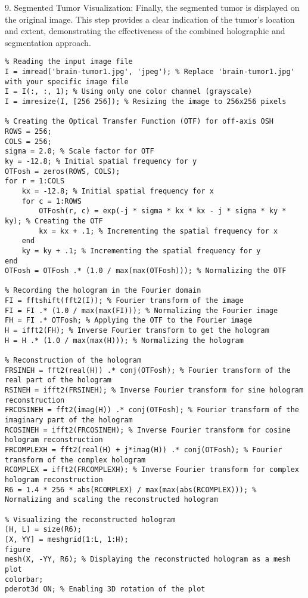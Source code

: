 \begin{appendices}
9. Segmented Tumor Visualization: Finally, the segmented tumor is displayed on the original image. This step provides a clear indication of the tumor's location and extent, demonstrating the effectiveness of the combined holographic and segmentation approach.
\\
\begin{lstlisting}
% Reading the input image file
I = imread('brain-tumor1.jpg', 'jpeg'); % Replace 'brain-tumor1.jpg' with your specific image file
I = I(:, :, 1); % Using only one color channel (grayscale)
I = imresize(I, [256 256]); % Resizing the image to 256x256 pixels

% Creating the Optical Transfer Function (OTF) for off-axis OSH
ROWS = 256;
COLS = 256;
sigma = 2.0; % Scale factor for OTF
ky = -12.8; % Initial spatial frequency for y
OTFosh = zeros(ROWS, COLS);
for r = 1:COLS
    kx = -12.8; % Initial spatial frequency for x
    for c = 1:ROWS
        OTFosh(r, c) = exp(-j * sigma * kx * kx - j * sigma * ky * ky); % Creating the OTF
        kx = kx + .1; % Incrementing the spatial frequency for x
    end
    ky = ky + .1; % Incrementing the spatial frequency for y
end
OTFosh = OTFosh .* (1.0 / max(max(OTFosh))); % Normalizing the OTF

% Recording the hologram in the Fourier domain
FI = fftshift(fft2(I)); % Fourier transform of the image
FI = FI .* (1.0 / max(max(FI))); % Normalizing the Fourier image
FH = FI .* OTFosh; % Applying the OTF to the Fourier image
H = ifft2(FH); % Inverse Fourier transform to get the hologram
H = H .* (1.0 / max(max(H))); % Normalizing the hologram

% Reconstruction of the hologram
FRSINEH = fft2(real(H)) .* conj(OTFosh); % Fourier transform of the real part of the hologram
RSINEH = ifft2(FRSINEH); % Inverse Fourier transform for sine hologram reconstruction
FRCOSINEH = fft2(imag(H)) .* conj(OTFosh); % Fourier transform of the imaginary part of the hologram
RCOSINEH = ifft2(FRCOSINEH); % Inverse Fourier transform for cosine hologram reconstruction
FRCOMPLEXH = fft2(real(H) + j*imag(H)) .* conj(OTFosh); % Fourier transform of the complex hologram
RCOMPLEX = ifft2(FRCOMPLEXH); % Inverse Fourier transform for complex hologram reconstruction
R6 = 1.4 * 256 * abs(RCOMPLEX) / max(max(abs(RCOMPLEX))); % Normalizing and scaling the reconstructed hologram

% Visualizing the reconstructed hologram
[H, L] = size(R6);
[X, YY] = meshgrid(1:L, 1:H);
figure
mesh(X, -YY, R6); % Displaying the reconstructed hologram as a mesh plot
colorbar;
pderot3d ON; % Enabling 3D rotation of the plot


\end{lstlisting}
\end{appendices}
